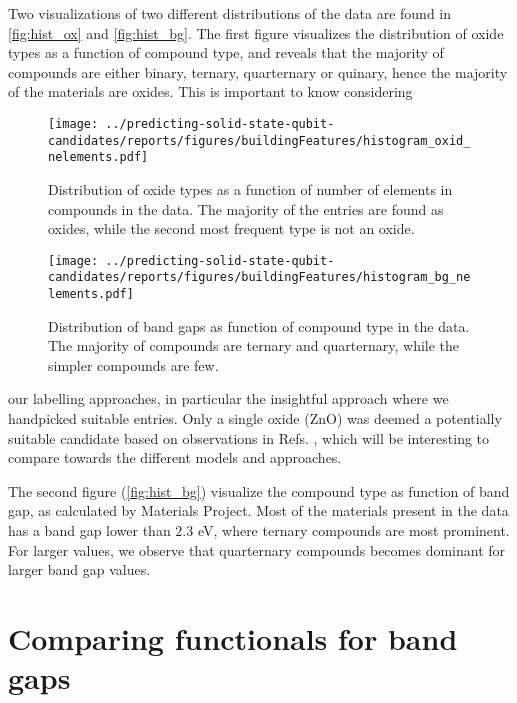 Two visualizations of two different distributions of the data are found in \autoref{fig:hist_ox} and \autoref{fig:hist_bg}.
The first figure visualizes the distribution of oxide types as a function of compound type, and reveals that the majority of compounds are either binary, ternary, quarternary or quinary, hence the majority of the materials are oxides.
This is important to know considering

\begin{figure}[]
      \centering
      \texttt{[image: ../predicting-solid-state-qubit-candidates/reports/figures/buildingFeatures/histogram\_oxid\_nelements.pdf]}
      \vspace*{-130mm}
      \caption{Distribution of oxide types as a function of number of elements in compounds in the data. The majority of the entries are found as oxides, while the second most frequent type is not an oxide. }
      \label{fig:hist_ox}
\end{figure}

\begin{figure}[]
      \centering
      \texttt{[image: ../predicting-solid-state-qubit-candidates/reports/figures/buildingFeatures/histogram\_bg\_nelements.pdf]}
      \vspace*{-130mm}
      \caption{Distribution of band gaps as function of compound type in the data. The majority of compounds are ternary and quarternary, while the simpler compounds are few.}
      \label{fig:hist_bg}
\end{figure}

\noindent our labelling approaches, in particular the insightful approach where we handpicked suitable entries.
Only a single oxide (ZnO) was deemed a potentially suitable candidate based on observations in Refs. \cite{Zhang2020, Zheng2014, Morfa2012}, which will be interesting to compare towards the different models and approaches.


The second figure (\autoref{fig:hist_bg}) visualize the compound type as function of band gap, as calculated by Materials Project. Most of the materials present in the data has a band gap lower than $2.3$ eV, where ternary compounds are most prominent. For larger values, we observe that quarternary compounds becomes dominant for larger band gap values.

\section{Comparing functionals for band gaps}

